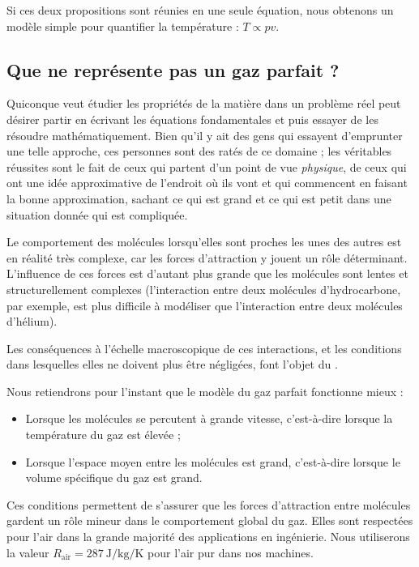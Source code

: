 		Si ces deux propositions sont réunies en une seule équation, nous obtenons un modèle simple pour quantifier la température : $T \propto p v$.
		
		
	\subsection{Que ne représente pas un gaz parfait ?}
	\label{ch_pas_gaz_parfait}
	
			Quiconque veut étudier les propriétés de la matière dans un problème réel peut désirer partir en écrivant les équations fondamentales et puis essayer de les résoudre mathématiquement. Bien qu’il y ait des gens qui essayent d’emprunter une telle approche, ces personnes sont des ratés de ce domaine ; les véritables réussites sont le fait de ceux qui partent d’un point de vue \emph{physique}, de ceux qui ont une idée approximative de l’endroit où ils vont et qui commencent en faisant la bonne approximation, sachant ce qui est grand et ce qui est petit dans une situation donnée qui est compliquée.
	
		Le comportement des molécules lorsqu’elles sont proches les unes des autres est en réalité très complexe, car les forces d’attraction y jouent un rôle déterminant. L’influence de ces forces est d’autant plus grande que les molécules sont lentes et structurellement complexes (l’interaction entre deux molécules d’hydrocarbone, par exemple, est plus difficile à modéliser que l’interaction entre deux molécules d’hélium).

		Les conséquences à l’échelle macroscopique de ces interactions, et les conditions dans lesquelles elles ne doivent plus être négligées, font l’objet du \courscinq.

		Nous retiendrons pour l’instant que le modèle du gaz parfait fonctionne mieux :

		\begin{itemize}
			\item Lorsque les molécules se percutent à grande vitesse, c’est-à-dire lorsque la température du gaz est élevée ;
			\item Lorsque l’espace moyen entre les molécules est grand, c’est-à-dire lorsque le volume spécifique du gaz est grand.
		\end{itemize}
		
		Ces conditions permettent de s’assurer que les forces d’attraction entre molécules gardent un rôle mineur dans le comportement global du gaz. Elles sont respectées pour l’air dans la grande majorité des applications en ingénierie. Nous utiliserons la valeur $R_\text{air} = \SI{287}{\joule\per\kilogram\per\kelvin}$ pour l’air pur dans nos machines.


